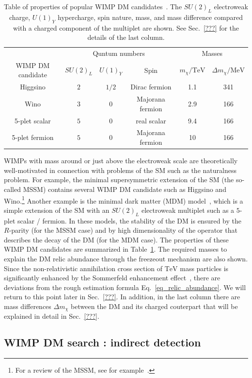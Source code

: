 \documentclass[12pt,twoside,book]{article}
\begin{document}
\begin{table}
 \centering
 \begin{tabular}{c|ccc|cc}
  & \multicolumn{3}{c|}{Quntum numbers} & \multicolumn{2}{c}{Masses}\\
  WIMP DM candidate & $SU(2)_L$ & $U(1)_Y$ & Spin & $m_\chi / \mathrm{TeV}$ &
  $\Delta m_\chi / \mathrm{MeV}$ \\
  \hline
  Higgsino & $2$ & $1/2$ & Dirac fermion & 1.1 & 341 \\
  Wino & $3$ & $0$ & Majorana fermion & 2.9 & 166 \\
  5-plet scalar & $5$ & $0$ & real scalar & 9.4 & 166 \\
  5-plet fermion & $5$ & $0$ & Majorana fermion & 10 & 166
 \end{tabular}
 \caption{Table of properties of popular WIMP DM
 candidates~\cite{Farina:2013mla, ArkaniHamed:2006mb, Hisano:2006nn,
 Cirelli:2007xd, Moroi:2013sla, Beneke:2016ync}.  The $SU(2)_L$
 electroweak charge, $U(1)_Y$ hypercharge, spin nature, mass, and mass
 difference compared with a charged component of the multiplet are
 shown.  See Sec.~\ref{???}   for the details of the last
 column.}  \label{tab_WIMP_property}
\end{table}


WIMPs with mass around or just above the electroweak scale are
theoretically well-motivated in connection with problems of the SM such
as the naturalness problem.  For example, the minimal supersymmetric
extension of the SM (the so-called MSSM) contains several WIMP DM
candidate such as Higgsino and Wino.\footnote{
For a review of the MSSM, see for example~\cite{Martin:1997ns}.
}
Another example is the minimal dark matter (MDM)
model~\cite{Cirelli:2005uq, Cirelli:2007xd, Cirelli:2009uv}, which is a
simple extension of the SM with an $SU(2)_L$ electroweak multiplet such
as a $5$-plet scalar / fermion.  In these models, the stability of the
DM is ensured by the $R$-parity (for the MSSM case) and by high
dimensionality of the operator that describes the decay of the DM (for
the MDM case).  The properties of these WIMP DM candidates are
summarized in Table~\ref{tab_WIMP_property}.  The required masses to
explain the DM relic abundance through the freezeout mechanism are also
shown.  Since the non-relativistic annihilation cross section of
$\mathrm{TeV}$ mass particles is significantly enhanced by the
Sommerfeld enhancement effect~\cite{Hisano:2004ds, Hisano:2006nn}, there
are deviations from the rough estimation formula
Eq.~\eqref{eq_relic_abundance}.  We will return to this point later in
Sec.~\ref{???}.    In addition, in the last column there
are mass differences $\Delta m_\chi$ between the DM and its charged
couterpart that will be explained in detail in Sec.~\ref{???}.

\subsection{WIMP DM search : indirect detection}

% 
% 
\end{document}
